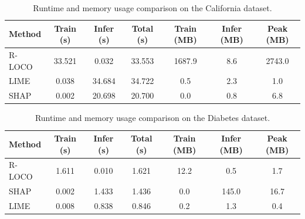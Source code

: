 \documentclass{article}
\newcommand{\R}{\mathbb{R}}
\newcommand{\Xspace}{\mathcal{X}}
\newcommand{\Yspace}{\mathcal{Y}}
\newcommand{\ind}{\mathbb{I}} %
\theoremstyle{plain}
\theoremstyle{definition}
\newtheorem{definition}[theorem]{Definition}
\theoremstyle{remark}
\begin{document}
\begin{table}[!ht]
\centering
\begin{tabular}{lcccccc}
\toprule
\textbf{Method} & \textbf{Train (s)} & \textbf{Infer (s)} & \textbf{Total (s)} & \textbf{Train (MB)} & \textbf{Infer (MB)} & \textbf{Peak (MB)} \\
\midrule
R-LOCO & 33.521 & 0.032 & 33.553 & 1687.9 & 8.6 & 2743.0 \\
LIME   & 0.038  & 34.684 & 34.722 & 0.5 & 2.3 & 1.0 \\
SHAP   & 0.002  & 20.698 & 20.700 & 0.0 & 0.8 & 6.8 \\
\bottomrule
\end{tabular}
\caption{Runtime and memory usage comparison on the California dataset.}
\label{tab:runtime-california}
\end{table}

\begin{table}[!ht]
\centering
\begin{tabular}{lcccccc}
\toprule
\textbf{Method} & \textbf{Train (s)} & \textbf{Infer (s)} & \textbf{Total (s)} & \textbf{Train (MB)} & \textbf{Infer (MB)} & \textbf{Peak (MB)} \\
\midrule
R-LOCO & 1.611 & 0.010 & 1.621 & 12.2 & 0.5 & 1.7 \\
SHAP   & 0.002 & 1.433 & 1.436 & 0.0 & 145.0 & 16.7 \\
LIME   & 0.008 & 0.838 & 0.846 & 0.2 & 1.3 & 0.4 \\
\bottomrule
\end{tabular}
\caption{Runtime and memory usage comparison on the Diabetes dataset.}
\label{tab:runtime-diabetes}
\end{table}










\end{document}
